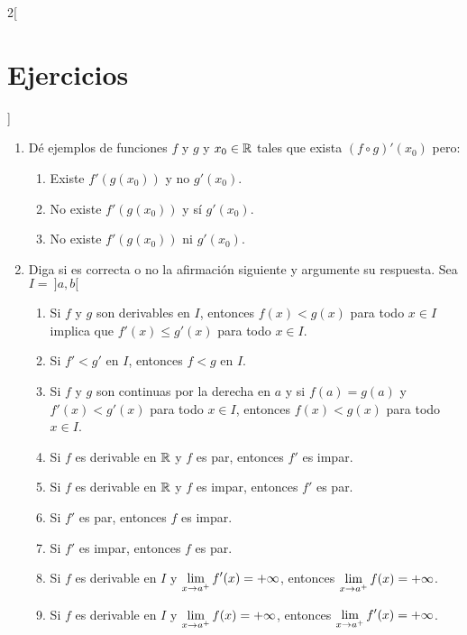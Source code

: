 \begin{multicols}{2}[\section{Ejercicios}]
\begin{enumerate}[leftmargin=*]
\item Dé ejemplos de funciones $f$ y $g$ y $x_0\in\Rbb$ tales que exista $(f\circ g)'(x_0)$
    pero:
    \begin{enumerate}[leftmargin=*]
    \item Existe $f'(g(x_0))$ y no $g'(x_0)$.
    \item No existe $f'(g(x_0))$ y sí $g'(x_0)$.
    \item No existe $f'(g(x_0))$ ni $g'(x_0)$.
    \end{enumerate}

\item Diga si es correcta o no la afirmación siguiente y argumente su respuesta. Sea $I = \
    ]a,b[$
    \begin{enumerate}[leftmargin=*]
    \item Si $f$ y $g$ son derivables en $I$, entonces $f(x) < g(x)$ para todo $x\in I$
        implica que $f'(x) \leq g'(x)$ para todo $x\in I$.
    \item Si $f' < g'$ en $I$, entonces $f < g$ en $I$.
    \item Si $f$ y $g$ son continuas por la derecha en $a$ y si $f(a) = g(a)$ y $f'(x) < g'(x)$ para todo $x\in I$, entonces $f(x) < g(x)$
        para todo $x\in I$.
    \item Si $f$ es derivable en $\Rbb$ y $f$ es par, entonces $f'$ es impar.
    \item Si $f$ es derivable en $\Rbb$ y $f$ es impar, entonces $f'$ es par.
    \item Si $f'$ es par, entonces $f$ es impar.
    \item Si $f'$ es impar, entonces $f$ es par.
    \item Si $f$ es derivable en $I$ y $\displaystyle\limjc{f'(x)}{x}{a^+} = +\infty$,
        entonces $\displaystyle\limjc{f(x)}{x}{a^+} = +\infty$.
    \item Si $f$ es derivable en $I$ y $\displaystyle\limjc{f(x)}{x}{a^+} = +\infty$,
        entonces $\displaystyle\limjc{f'(x)}{x}{a^+} = +\infty$.
    \end{enumerate}
\end{enumerate}
\endgroup
\end{multicols}

